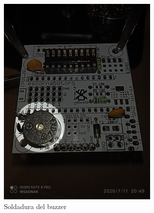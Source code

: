 \documentclass{article}
\begin{document}
\begin{figure}[H]
\begin{subfigure}[t]{0.3\textwidth}
        \includegraphics[width=0.9\columnwidth, height=1.2\columnwidth]{images/CPU/cpu_buzzer_1.png}
        \caption{Soldadura del buzzer}
        \label{fig:cpu_buzzer_1}
    \end{subfigure}%
    \begin{subfigure}[t]{0.3\textwidth}
        \centering

\end{subfigure}
\end{figure}
\end{document}
